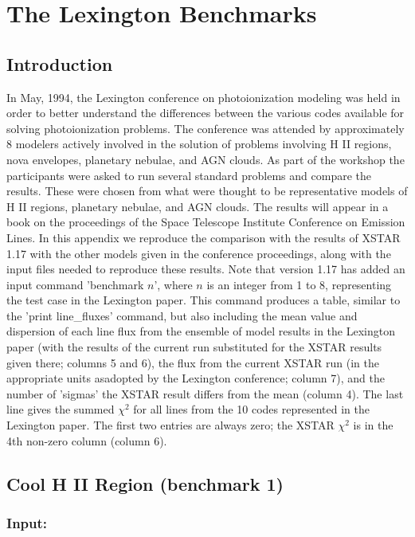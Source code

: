 \chapter{The Lexington Benchmarks}
\label{sec:lexington}
\section{Introduction}

In May, 1994, the Lexington conference on photoionization modeling was 
held in order to better understand the differences between the various 
codes available for solving photoionization problems.  The conference 
was attended by approximately 8 modelers actively involved in the 
solution of problems involving H II regions, nova envelopes, planetary 
nebulae, and AGN clouds.  As part of the workshop the participants were 
asked to run several standard problems and compare the results.  These 
were chosen from what were thought to be representative models of H II 
regions, planetary nebulae, and AGN clouds.  The results will 
appear in a book on the proceedings of the Space Telescope Institute 
Conference on Emission Lines.  In this appendix we reproduce 
the comparison with the results of XSTAR 1.17 with the other models 
given in the conference proceedings, along with the input files needed 
to reproduce these results.  Note that version 1.17 has added an 
input command 'benchmark $n$', where $n$ is an integer from 1 to 8, 
representing the test case in the Lexington paper.  This command produces 
a table, similar to the 'print line\_fluxes' command, but also including the 
mean value and dispersion of each line flux from the ensemble of model results 
in the Lexington paper (with the results of the current run substituted for 
the XSTAR results given there; columns 5 and 6), the flux from the current 
XSTAR run (in the appropriate units asadopted by the Lexington conference; 
column 7), and the number of 'sigmas' the XSTAR result differs from the mean
(column 4).  The last line gives the summed $\chi^2$ for all lines from the 
10 codes represented in the Lexington paper.  The first two entries are always 
zero; the XSTAR $\chi^2$ is in the 4th non-zero column (column 6).

\section{Cool H II Region (benchmark 1)}

\subsection{ Input:}


